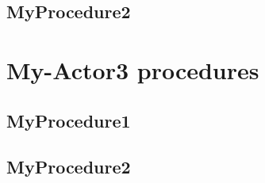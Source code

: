 \subsection{MyProcedure2}


\section{My-Actor3 procedures}

\subsection{MyProcedure1}
\subsection{MyProcedure2}















